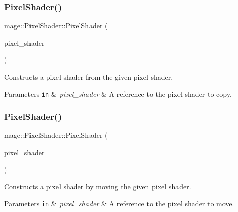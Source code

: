 \subsubsection{\texorpdfstring{Pixel\+Shader()}{PixelShader()}\hspace{0.1cm}{\footnotesize\ttfamily [5/6]}}
{\footnotesize\ttfamily mage\+::\+Pixel\+Shader\+::\+Pixel\+Shader (\begin{DoxyParamCaption}\item[{const \hyperlink{classmage_1_1_pixel_shader}{Pixel\+Shader} \&}]{pixel\+\_\+shader }\end{DoxyParamCaption})\hspace{0.3cm}{\ttfamily [delete]}}

Constructs a pixel shader from the given pixel shader.


\begin{DoxyParams}[1]{Parameters}
\mbox{\tt in}  & {\em pixel\+\_\+shader} & A reference to the pixel shader to copy. \\
\hline
\end{DoxyParams}
\hypertarget{classmage_1_1_pixel_shader_a5b2d7d36082d25c6f860674df745f7cd}{}\label{classmage_1_1_pixel_shader_a5b2d7d36082d25c6f860674df745f7cd} 
\subsubsection{\texorpdfstring{Pixel\+Shader()}{PixelShader()}\hspace{0.1cm}{\footnotesize\ttfamily [6/6]}}
{\footnotesize\ttfamily mage\+::\+Pixel\+Shader\+::\+Pixel\+Shader (\begin{DoxyParamCaption}\item[{\hyperlink{classmage_1_1_pixel_shader}{Pixel\+Shader} \&\&}]{pixel\+\_\+shader }\end{DoxyParamCaption})\hspace{0.3cm}{\ttfamily [default]}}

Constructs a pixel shader by moving the given pixel shader.


\begin{DoxyParams}[1]{Parameters}
\mbox{\tt in}  & {\em pixel\+\_\+shader} & A reference to the pixel shader to move. \\
\hline
\end{DoxyParams}
\hypertarget{classmage_1_1_pixel_shader_aac21a59d5d614f5bf1905f01479de44e}{}\label{classmage_1_1_pixel_shader_aac21a59d5d614f5bf1905f01479de44e} 
